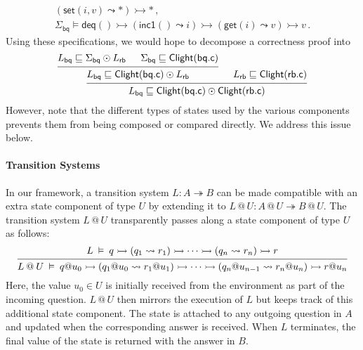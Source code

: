 \documentclass[acmsmall,screen,review,anonymous]{acmart}
\newcommand{\kw}[1]{\ensuremath{ \mathsf{#1} }}
\begin{document}
\begin{example}
\[\begin{array}{l}
      (\kw{set}(i, v) \leadsto *) \rightarrowtail
      * \,,
    \\
    \Sigma_\kw{bq} \vDash
      \kw{deq}() \rightarrowtail
      (\kw{inc1}() \leadsto i) \rightarrowtail
      (\kw{get}(i) \leadsto v) \rightarrowtail
      v \,.
  \end{array}
\]
Using these specifications,
we would hope to decompose a correctness proof into
\[
  \begin{prooftree}
    \hypo{L_\kw{bq} \sqsubseteq \Sigma_\kw{bq} \odot L_\kw{rb}}
    \hypo{\Sigma_\kw{bq} \sqsubseteq \kw{Clight}(\kw{bq.c})}
    \infer2{L_\kw{bq} \sqsubseteq \kw{Clight}(\kw{bq.c}) \odot L_\kw{rb}}
    \hypo{L_\kw{rb} \sqsubseteq \kw{Clight}(\kw{rb.c})}
    \infer2{L_\kw{bq} \sqsubseteq \kw{Clight}(\kw{bq.c}) \odot \kw{Clight}(\kw{rb.c})}
  \end{prooftree}
\]
However, note that the different types of states
used by the various components
prevents them from being composed or compared directly.
We address this issue below.
\end{example}

\paragraph{Transition Systems} %

In our framework,
a transition system
$L : A \twoheadrightarrow B$
can be made compatible with an extra state component of type $U$
by extending it to
$
  L \mathbin@ U : A \mathbin@ U \twoheadrightarrow B \mathbin@ U
$.
The transition system $L \mathbin@ U$ transparently passes along
a state component of type $U$ as follows:
\begin{equation} \label{eqn:slift}
  \begin{prooftree}
  \hypo{
  L \:\vDash\: q \rightarrowtail
    (q_1 \leadsto r_1) \rightarrowtail
    \cdots \rightarrowtail
    (q_n \leadsto r_n) \rightarrowtail
    r
  }
  \infer1{
  L \mathbin@ U \:\vDash\: q@u_0 \rightarrowtail
    (q_1@u_0 \leadsto r_1@u_1) \rightarrowtail
    \cdots \rightarrowtail
    (q_n@u_{n-1} \leadsto r_n@u_n) \rightarrowtail
    r@u_n
  }
  \end{prooftree}
\end{equation}
Here, the value $u_0 \in U$
is initially received from the environment as part of the incoming question.
$L \mathbin@ U$ then mirrors the execution of $L$
but keeps track of this additional state component.
The state is attached to any outgoing question in $A$
and updated when the corresponding answer is received.
When $L$ terminates,
the final value of the state is returned with the answer in $B$.
\end{document}
